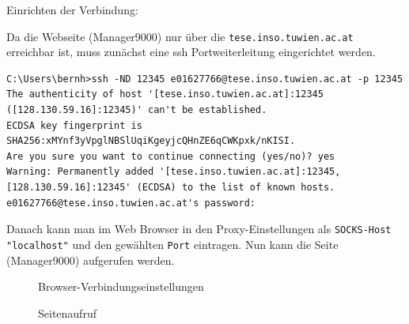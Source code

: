 \documentclass[12pt,a4paper,titlepage,oneside]{scrartcl}
\begin{document}
Einrichten der Verbindung:

Da die Webseite (Manager9000) nur über die \lstinline{tese.inso.tuwien.ac.at} erreichbar ist, muss zunächst eine ssh Portweiterleitung eingerichtet werden.

\begin{lstlisting}
C:\Users\bernh>ssh -ND 12345 e01627766@tese.inso.tuwien.ac.at -p 12345
The authenticity of host '[tese.inso.tuwien.ac.at]:12345 ([128.130.59.16]:12345)' can't be established.
ECDSA key fingerprint is SHA256:xMYnf3yVpglNBSlUqiKgeyjcQHnZE6qCWKpxk/nKISI.
Are you sure you want to continue connecting (yes/no)? yes
Warning: Permanently added '[tese.inso.tuwien.ac.at]:12345,[128.130.59.16]:12345' (ECDSA) to the list of known hosts.
e01627766@tese.inso.tuwien.ac.at's password:
\end{lstlisting}

Danach kann man im Web Browser in den Proxy-Einstellungen als \lstinline{SOCKS-Host "localhost"} und den gewählten \lstinline{Port} eintragen. Nun kann die Seite (Manager9000) aufgerufen werden.

\begin{figure}[h!]
  \centering
  \caption{Browser-Verbindungseinstellungen}
  \label{fig:proxy}
\end{figure}

\begin{figure}[h!]
  \centering
  \caption{Seitenaufruf}
  \label{fig:enterSite}
\end{figure}

\pagebreak
\end{document}
